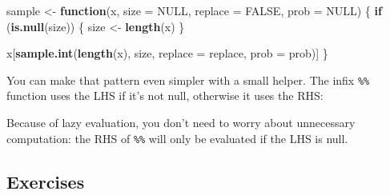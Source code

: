 \documentclass[]{book}
\newenvironment{Shaded}{\begin{snugshade}}{\end{snugshade}}
\newcommand{\ControlFlowTok}[1]{\textcolor[rgb]{0.13,0.29,0.53}{\textbf{#1}}}
\newcommand{\DataTypeTok}[1]{\textcolor[rgb]{0.13,0.29,0.53}{#1}}
\newcommand{\KeywordTok}[1]{\textcolor[rgb]{0.13,0.29,0.53}{\textbf{#1}}}
\newcommand{\NormalTok}[1]{#1}
\newcommand{\OperatorTok}[1]{\textcolor[rgb]{0.81,0.36,0.00}{\textbf{#1}}}
\newcommand{\OtherTok}[1]{\textcolor[rgb]{0.56,0.35,0.01}{#1}}
\newcommand{\StringTok}[1]{\textcolor[rgb]{0.31,0.60,0.02}{#1}}
\theoremstyle{definition}
\theoremstyle{definition}
\theoremstyle{definition}
\theoremstyle{remark}
\begin{document}
\begin{Shaded}
\begin{Highlighting}[]
\NormalTok{sample <-}\StringTok{ }\ControlFlowTok{function}\NormalTok{(x, }\DataTypeTok{size =} \OtherTok{NULL}\NormalTok{, }\DataTypeTok{replace =} \OtherTok{FALSE}\NormalTok{, }\DataTypeTok{prob =} \OtherTok{NULL}\NormalTok{) \{}
  \ControlFlowTok{if}\NormalTok{ (}\KeywordTok{is.null}\NormalTok{(size)) \{}
\NormalTok{    size <-}\StringTok{ }\KeywordTok{length}\NormalTok{(x)}
\NormalTok{  \}}
  
\NormalTok{  x[}\KeywordTok{sample.int}\NormalTok{(}\KeywordTok{length}\NormalTok{(x), size, }\DataTypeTok{replace =}\NormalTok{ replace, }\DataTypeTok{prob =}\NormalTok{ prob)]}
\NormalTok{\}}
\end{Highlighting}
\end{Shaded}

You can make that pattern even simpler with a small helper. The infix
\texttt{\%\textbar{}\textbar{}\%} function uses the LHS if it's not
null, otherwise it uses the RHS:

\begin{Shaded}
\end{Shaded}

Because of lazy evaluation, you don't need to worry about unnecessary
computation: the RHS of \texttt{\%\textbar{}\textbar{}\%} will only be
evaluated if the LHS is null.

\hypertarget{exercises-2}{%
\subsection{Exercises}\label{exercises-2}}
\end{document}
